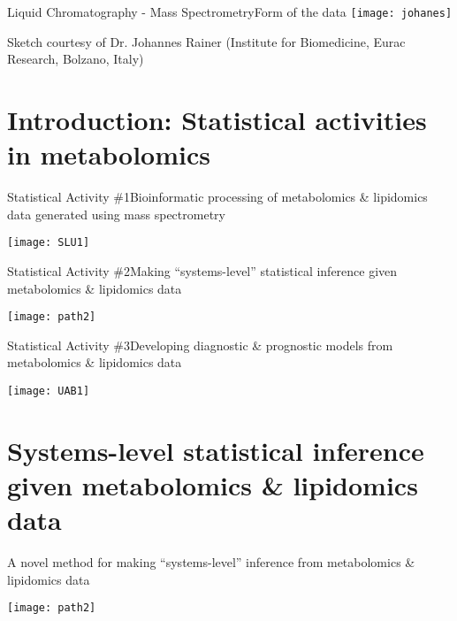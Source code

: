 \documentclass[xcolor=dvipsnames]{beamer}
\begin{document}
\begin{frame}{Liquid Chromatography - Mass Spectrometry}{Form of the data}
\vspace{-7pt}
\texttt{[image: johanes]}

\tiny{Sketch courtesy of Dr. Johannes Rainer (Institute for Biomedicine, Eurac Research, Bolzano, Italy)}
\end{frame}

\section{Introduction: Statistical activities in metabolomics}
\begin{frame}{Statistical Activity \#1}{Bioinformatic processing of metabolomics \& lipidomics data generated using mass spectrometry}
\vspace{-15pt}
\begin{center}
	\texttt{[image: SLU1]}
\end{center}
\end{frame}

\begin{frame}{Statistical Activity \#2}{Making ``systems-level'' statistical inference given metabolomics \& lipidomics data}
\vspace{-15pt}
\begin{center}
\texttt{[image: path2]}
\end{center}
\end{frame}

\begin{frame}{Statistical Activity \#3}{Developing diagnostic \& prognostic models from metabolomics \& lipidomics data}
\vspace{-15pt}
\begin{center}
\texttt{[image: UAB1]}
\end{center}
\end{frame}

\section[Systems-level statistical inference]{Systems-level statistical inference given metabolomics \& lipidomics data}

\begin{frame}{A novel method for making ``systems-level'' inference from metabolomics \& lipidomics data}
\vspace{-15pt}
\begin{center}
	\texttt{[image: path2]}
\end{center}
\end{frame}
\end{document}
